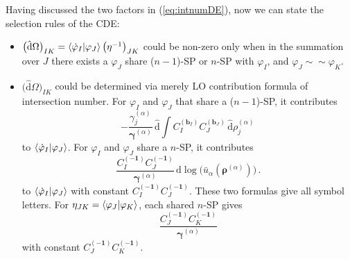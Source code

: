 \documentclass[a4paper,11pt]{article}
\newcommand{\nds}{\hat{\mathrm{d}}}
\def\eref#1{(\ref{#1})}
\begin{document}
Having discussed the two factors in \eref{eq:intnumDE}, now we can state the selection rules of the CDE:
\begin{itemize}
\item $\big( \nds \Omega \big)_{IK} = \braket{\dot{\varphi}_I|\varphi_J} \big( \eta^{-1} \big)_{JK}$ could be non-zero only when in the summation over $J$ there exists a $\varphi_J$ share ($n-1$)-SP or $n$-SP with $\varphi_I$, and $\varphi_J\sim\sim\varphi_K$.
\item $\big( \nds \Omega \big)_{IK}$ could be determined via merely LO contribution formula of intersection number. For $\varphi_I$ and $\varphi_J$ that share a  ($n-1$)-SP, it contributes
\begin{equation}
    -{\frac{{\gamma}^{(\alpha)}_j }{\bm{{\gamma}}^{(\alpha)}}} \, \nds \int C_I^{(\bm{b}_I)}C_J^{(\bm{b}_J)} \, \nds \rho^{(\alpha)}_j \,
    \label{eq:NMCSPdlog1}
\end{equation}
to $\braket{\dot{\varphi}_I|\varphi_J}$. For $\varphi_I$ and $\varphi_J$ share a  $n$-SP, it contributes
\begin{equation}
\frac{C_I^{(\bm{-1})} C_J^{(\bm{-1})}}{\bm{\gamma}^{(\alpha)}} \, \nds \log \Big( \bar{u}_\alpha(\bm{\rho}^{(\alpha)}) \Big) \,.  \label{eq:CSPdlog1}
\end{equation}
to $\braket{\dot{\varphi}_I|\varphi_J}$ with constant $C_I^{(\bm{-1})} C_J^{(\bm{-1})}$. These two formulas give all symbol letters. For $\eta_{JK}=\braket{\varphi_J|\varphi_K}$, each shared $n$-SP gives
\begin{equation}
 \frac{C_J^{(\bm{-1})} C_K^{(\bm{-1})}}{\bm{\gamma}^{(\alpha)}}  \label{eq:inveta}
\end{equation}
with constant $C_J^{(\bm{-1})} C_K^{(\bm{-1})}$.


\end{itemize}
\end{document}
